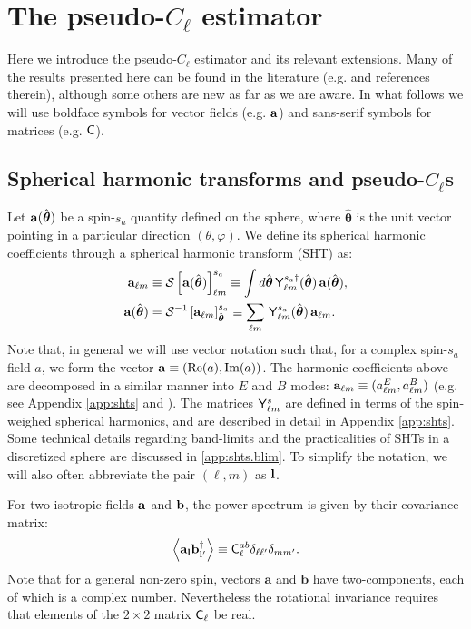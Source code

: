 \documentclass[usenatbib]{mnrasb}
\newcommand{\nv}{\hat{\boldsymbol{\theta}}}
\newcommand{\va}{{\mathbf{a}}}
\newcommand{\vb}{{\mathbf{b}}}
\begin{document}
  \section{The pseudo-\texorpdfstring{$C_\ell$}{Cl} estimator}\label{sec:maths}
    Here we introduce the pseudo-$C_\ell$ estimator and its relevant extensions. Many of the results presented here can be found in the literature (e.g. \cite{2002ApJ...567....2H,2003ApJS..148..161K,2006PhRvD..74h3002S,2009PhRvD..79l3515G,2013A&A...554A.112R,2017MNRAS.465.1847E} and references therein), although some others are new as far as we are aware. In what follows we will use boldface symbols for vector fields (e.g. ${\bf a}$) and sans-serif symbols for matrices (e.g. ${\sf C}$).
    
    \subsection{Spherical harmonic transforms and pseudo-\texorpdfstring{$C_\ell$}{Cl}s}\label{ssec:maths.pcl101}
      Let ${\bf a}(\nv)$ be a spin-$s_a$ quantity defined on the sphere, where $\nv$ is the unit vector pointing in a particular direction $(\theta,\varphi)$. We define its spherical harmonic coefficients through a spherical harmonic transform (SHT) as:
      \begin{align}\label{eq:sht1}
        {\bf a}_{\ell m}&\equiv\mathcal{S}\left[{\bf a}(\nv)\right]^{s_a}_{\ell m}\equiv\int d\nv\,{\sf Y}^{s_a\dag}_{\ell m}(\nv)\,{\bf a}(\nv), \\\label{eq:sht2}
        {\bf a}(\nv)&=\mathcal{S}^{-1}\left[{\bf a}_{\ell m}\right]^{s_a}_{\nv}\equiv\sum_{\ell m}\,{\sf Y}^{s_a}_{\ell m}(\nv)\,{\bf a}_{\ell m}.
      \end{align}
      Note that, in general we will use vector notation such that, for a complex spin-$s_a$ field $a$, we form the vector ${\bf a}\equiv({\rm Re}(a),{\rm Im}(a))$. The harmonic coefficients above are decomposed in a similar manner into $E$ and $B$ modes: ${\bf a}_{\ell m}\equiv(a^E_{\ell m},a^B_{\ell m})$ (e.g. see Appendix \ref{app:shts} and \cite{1997PhRvD..55.1830Z}). The matrices ${\sf Y}^s_{\ell m}$ are defined in terms of the spin-weighed spherical harmonics, and are described in detail in Appendix \ref{app:shts}. Some technical details regarding band-limits and the practicalities of SHTs in a discretized sphere are discussed in \ref{app:shts.blim}. To simplify the notation, we will also often abbreviate the pair $(\ell,m)$ as ${\bf l}$. 
      
      For two isotropic fields ${\bf a}$ and ${\bf b}$, the power spectrum is given by their covariance matrix:
      \begin{equation}\label{eq:cldef}
        \left\langle{\bf a}_{\bf l}{\bf b}_{{\bf l}'}^\dag\right\rangle\equiv{\sf C}^{ab}_\ell\delta_{\ell\ell'}\delta_{mm'}.
      \end{equation}
      Note that for a general non-zero spin, vectors $\va$ and $\vb$ have two-components, each of which is a complex number. Nevertheless the rotational invariance requires that elements of the $2\times2$ matrix ${\sf C}_\ell$ be real.
\end{document}
